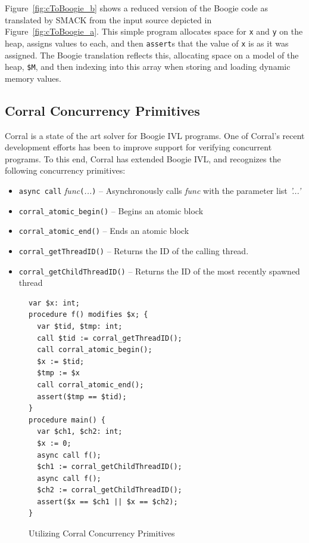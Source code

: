 Figure~\ref{fig:cToBoogie_b} shows a reduced version of the Boogie
code as translated by SMACK from the input source depicted in
Figure~\ref{fig:cToBoogie_a}.  This simple program allocates space for
\lstinline|x| and \lstinline|y| on the heap, assigns values to each,
and then \lstinline|assert|s that the value of \lstinline|x| is as it
was assigned.  The Boogie translation reflects this, allocating space
on a model of the heap, \lstinline|$M|, and then indexing into this
array when storing and loading dynamic memory values.

\subsection{Corral Concurrency Primitives}
Corral is a state of the art solver for Boogie IVL programs.  One of
Corral's recent development efforts has been to improve support for
verifying concurrent programs.  To this end, Corral has extended
Boogie IVL, and recognizes the following concurrency primitives:

\begin{itemize}
\item \lstinline|async call|
  \emph{func}\lstinline|(|\emph{...}\lstinline|)| -- Asynchronously
  calls \emph{func} with the parameter list \emph{'...'} 
\item \lstinline|corral_atomic_begin()| -- Begins an atomic block
\item \lstinline|corral_atomic_end()| -- Ends an atomic block
\item \lstinline|corral_getThreadID()| -- Returns the ID of the
  calling thread.
\item \lstinline|corral_getChildThreadID()| -- Returns the ID of the
  most recently spawned thread
\end{itemize}

\begin{figure}[!ht]
\centering
\begin{lstlisting}[language=boogie]
var $x: int;
procedure f() modifies $x; {
  var $tid, $tmp: int;
  call $tid := corral_getThreadID();
  call corral_atomic_begin();
  $x := $tid;
  $tmp := $x
  call corral_atomic_end();
  assert($tmp == $tid);
}
procedure main() {
  var $ch1, $ch2: int;
  $x := 0;
  async call f();
  $ch1 := corral_getChildThreadID();
  async call f();
  $ch2 := corral_getChildThreadID();
  assert($x == $ch1 || $x == $ch2);
}
\end{lstlisting}
\caption{Utilizing Corral Concurrency Primitives}
\label{fig:corralprimitives}
\end{figure}


